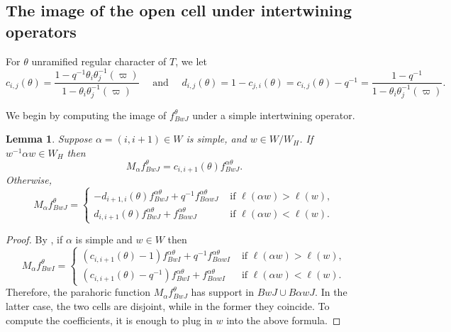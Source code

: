 \documentclass{amsart}
\newtheorem{lemma}[thm]{Lemma}
\theoremstyle{definition}
\begin{document}
{\subsection{The image of the open cell under intertwining operators}
For $\theta$ unramified regular character   of $T$, we let 
\[c_{i,j}(\theta)=\dfrac{1-q^{-1}\theta_i\theta_j^{-1}(\varpi)}{1-\theta_i\theta_j^{-1}(\varpi)}\quad \text{ and }\quad d_{i,j}(\theta)=1-c_{j,i}(\theta)=c_{i,j}(\theta)-q^{-1}=\dfrac{1-q^{-1}}{1-\theta_i\theta_j^{-1}(\varpi)}.\] 

We begin by computing the image of $f_{BwJ}^\theta$ under a simple
intertwining operator.
\begin{lemma}\label{l:parahoric-intertwining}
Suppose $\alpha=(i,i+1)\in W$ is simple, and $w\in W/W_H$. If
$w^{-1}\alpha w\in W_H$ then
\[M_\alpha f^\theta_{BwJ}=c_{i,i+1}(\theta)f^{\alpha \theta}_{BwJ}.\]
Otherwise,
\[M_\alpha f^\theta_{BwJ}=\begin{cases}
-d_{i+1,i}(\theta)f_{BwJ}^{\alpha
  \theta}+q^{-1}f^{\alpha \theta}_{B \alpha wJ}&\text{ if }\ell(\alpha w)>\ell(w),\\
d_{i,i+1}(\theta)f_{BwJ}^{\alpha
  \theta}+f^{\alpha \theta}_{B \alpha wJ}&\text{ if }\ell(\alpha w)<\ell(w). 
\end{cases}
\]
\end{lemma}
\begin{proof}
By
\cite[Thm. 3.4]{casselman:unramified}, if $\alpha$ is simple and
$w\in W$ then
\[M_\alpha
f^\theta_{BwI}=\begin{cases}(c_{i,i+1}(\theta)-1)f_{BwI}^{\alpha
  \theta}+q^{-1}f^{\alpha \theta}_{B \alpha wI}&\text{ if }\ell(\alpha w)>\ell(w),\\
(c_{i,i+1}(\theta)-q^{-1})f_{BwI}^{\alpha
  \theta}+f^{\alpha \theta}_{B \alpha wI}&\text{ if }\ell(\alpha w)<\ell(w). 
\end{cases}\]
Therefore, the parahoric function $M_\alpha f_{BwJ}^\theta$ has support in $BwJ\cup B \alpha w J$. In the latter case, the two cells are disjoint, while in the former they coincide. To compute the coefficients, it is enough to plug in $w$ into the above formula.
\end{proof}



}
\end{document}

